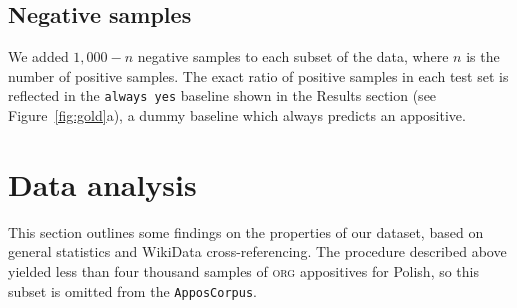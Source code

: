 \documentclass[11pt]{article}
\newcommand{\jttodo}[1]{\todo[color=blue!20]{#1}}
\newcommand{\corpus}{\texttt{ApposCorpus}}
\begin{document}
\subsection{Negative samples} We added $1,000-n$ negative samples to each subset of the data, where $n$ is the number of positive samples.
The exact ratio of positive samples in each test set is reflected in the \texttt{always yes} baseline shown in the Results section (see Figure~\ref{fig:gold}a), a dummy baseline which always predicts an appositive. 

\section{Data analysis}
\label{sec:data_analysis}
This section outlines some findings on the properties of our dataset, based on general statistics and WikiData cross-referencing. The procedure described above yielded less than four thousand samples of \textsc{org} appositives for Polish, so this subset is omitted from the \corpus. 
\end{document}
